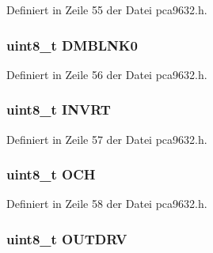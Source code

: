 Definiert in Zeile 55 der Datei pca9632.\+h.

\hypertarget{structpca9632__mode2_a583f0c01b7fec1b5ab18192c1f70e317}{}
\subsubsection[{D\+M\+B\+L\+N\+K0}]{\setlength{\rightskip}{0pt plus 5cm}uint8\+\_\+t D\+M\+B\+L\+N\+K0}\label{structpca9632__mode2_a583f0c01b7fec1b5ab18192c1f70e317}


Definiert in Zeile 56 der Datei pca9632.\+h.

\hypertarget{structpca9632__mode2_aa0cc6492902abe86e827dbdcc3bd30ab}{}
\subsubsection[{I\+N\+V\+R\+T}]{\setlength{\rightskip}{0pt plus 5cm}uint8\+\_\+t I\+N\+V\+R\+T}\label{structpca9632__mode2_aa0cc6492902abe86e827dbdcc3bd30ab}


Definiert in Zeile 57 der Datei pca9632.\+h.

\hypertarget{structpca9632__mode2_a5858103b8db2d73b32003ae6171c799d}{}
\subsubsection[{O\+C\+H}]{\setlength{\rightskip}{0pt plus 5cm}uint8\+\_\+t O\+C\+H}\label{structpca9632__mode2_a5858103b8db2d73b32003ae6171c799d}


Definiert in Zeile 58 der Datei pca9632.\+h.

\hypertarget{structpca9632__mode2_a43c059476c30e0592582328edb231ded}{}
\subsubsection[{O\+U\+T\+D\+R\+V}]{\setlength{\rightskip}{0pt plus 5cm}uint8\+\_\+t O\+U\+T\+D\+R\+V}\label{structpca9632__mode2_a43c059476c30e0592582328edb231ded}


